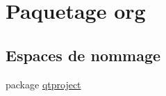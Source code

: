 \hypertarget{namespaceorg}{\section{Paquetage org}
\label{namespaceorg}
}
\subsection*{Espaces de nommage}
\begin{DoxyCompactItemize}
\item 
package \hyperlink{namespaceorg_1_1qtproject}{qtproject}
\end{DoxyCompactItemize}

